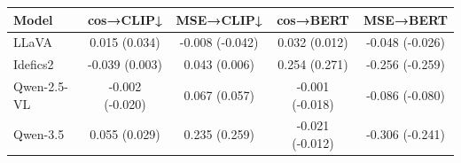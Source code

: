 \begin{tabular}{lcccc}
\toprule
Model & cos→CLIP↓ & MSE→CLIP↓ & cos→BERT & MSE→BERT \\
\midrule
LLaVA & 0.015 (0.034) & -0.008 (-0.042) & 0.032 (0.012) & -0.048 (-0.026) \\
Idefics2 & -0.039 (0.003) & 0.043 (0.006) & 0.254 (0.271) & -0.256 (-0.259) \\
Qwen-2.5-VL & -0.002 (-0.020) & 0.067 (0.057) & -0.001 (-0.018) & -0.086 (-0.080) \\
Qwen-3.5 & 0.055 (0.029) & 0.235 (0.259) & -0.021 (-0.012) & -0.306 (-0.241) \\
\bottomrule
\end{tabular}